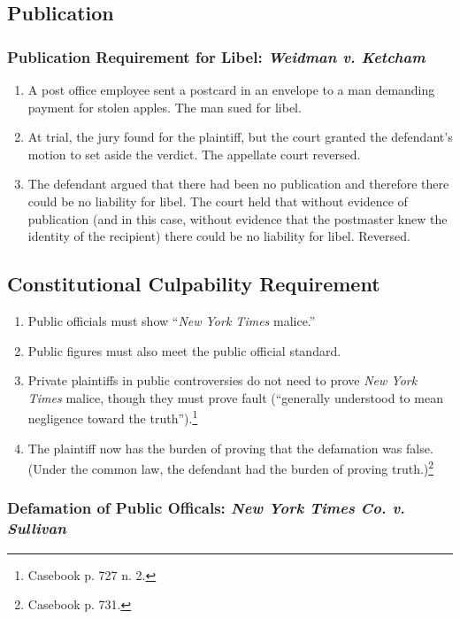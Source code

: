 \subsection{Publication}

\subsubsection{Publication Requirement for Libel: \emph{Weidman v. Ketcham}}

\begin{enumerate}
    \item A post office employee sent a postcard in an envelope to a man 
    demanding payment for stolen apples. The man sued for libel.
    \item At trial, the jury found for the plaintiff, but the court granted 
    the defendant's motion to set aside the verdict. The appellate court 
    reversed.
    \item The defendant argued that there had been no publication and 
    therefore there could be no liability for libel. The court held that 
    without evidence of publication (and in this case, without evidence that 
    the postmaster knew the identity of the recipient) there could be no 
    liability for libel. Reversed.
\end{enumerate}

\subsection{Constitutional Culpability Requirement}

\begin{enumerate}
    \item Public officials must show ``\emph{New York Times} malice.''
    \item Public figures must also meet the public official standard.
    \item Private plaintiffs in public controversies do not need to prove 
    \emph{New York Times} malice, though they must prove fault (``generally 
    understood to mean negligence toward the truth'').\footnote{Casebook p. 
    727 n. 2.}
    \item The plaintiff now has the burden of proving that the defamation was 
    false. (Under the common law, the defendant had the burden of proving 
    truth.)\footnote{Casebook p. 731.}
\end{enumerate}

\subsubsection{Defamation of Public Officals: \emph{New York Times Co. v. Sullivan}}

